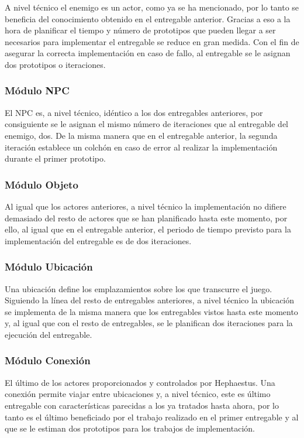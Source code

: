 A nivel técnico el enemigo es un actor, como ya se ha mencionado, por lo tanto se beneficia del conocimiento obtenido en el entregable anterior. Gracias a eso a la hora de planificar el tiempo y número de prototipos que pueden llegar a ser necesarios para implementar el entregable se reduce en gran medida. Con el fin de asegurar la correcta implementación en caso de fallo, al entregable se le asignan dos prototipos o iteraciones.

\subsubsection{Módulo NPC}

El NPC es, a nivel técnico, idéntico a los dos entregables anteriores, por consiguiente se le asignan el mismo número de iteraciones que al entregable del enemigo, dos. De la misma manera que en el entregable anterior, la segunda iteración establece un colchón en caso de error al realizar la implementación durante el primer prototipo.

\subsubsection{Módulo Objeto}

Al igual que los actores anteriores, a nivel técnico la implementación no difiere demasiado del resto de actores que se han planificado hasta este momento, por ello, al igual que en el entregable anterior, el periodo de tiempo previsto para la implementación del entregable es de dos iteraciones.

\subsubsection{Módulo Ubicación}

Una ubicación define los emplazamientos sobre los que transcurre el juego. Siguiendo la línea del resto de entregables anteriores, a nivel técnico la ubicación se implementa de la misma manera que los entregables vistos hasta este momento y, al igual que con el resto de entregables, se le planifican dos iteraciones para la ejecución del entregable.

\subsubsection{Módulo Conexión}

El último de los actores proporcionados y controlados por Hephaestus. Una conexión permite viajar entre ubicaciones y, a nivel técnico, este es último entregable con características parecidas a los ya tratados hasta ahora, por lo tanto es el último beneficiado por el trabajo realizado en el primer entregable y al que se le estiman dos prototipos para los trabajos de implementación.

